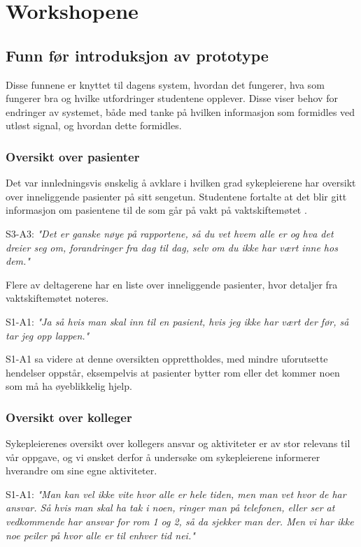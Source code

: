 \section{Workshopene}
\label{ws}

\subsection{Funn før introduksjon av prototype}
Disse funnene er knyttet til dagens system, hvordan det fungerer, hva som fungerer bra og hvilke utfordringer studentene opplever. Disse viser behov for endringer av systemet, både med tanke på hvilken informasjon som formidles ved utløst signal, og hvordan dette formidles.

\subsubsection{Oversikt over pasienter}
Det var innledningsvis ønskelig å avklare i hvilken grad sykepleierene har oversikt over inneliggende pasienter på sitt sengetun. Studentene fortalte at det blir gitt informasjon om pasientene til de som går på vakt på vaktskiftemøtet .

\noindent
S3-A3: \emph{"Det er ganske nøye på rapportene, så du vet hvem alle er og hva det dreier seg om, forandringer fra dag til dag, selv om du ikke har vært inne hos dem."}

\noindent
Flere av deltagerene har en liste over inneliggende pasienter, hvor detaljer fra vaktskiftemøtet noteres.

\noindent
S1-A1: \emph{"Ja så hvis man skal inn til en pasient, hvis jeg ikke har vært der før, så tar jeg opp lappen."}

\noindent
S1-A1 sa videre at denne oversikten opprettholdes, med mindre uforutsette hendelser oppstår, eksempelvis at pasienter bytter rom eller det kommer noen som må ha øyeblikkelig hjelp.
 
 
\subsubsection{Oversikt over kolleger}
Sykepleierenes oversikt over kollegers ansvar og aktiviteter er av stor relevans til vår oppgave, og vi ønsket derfor å undersøke om sykepleierene informerer hverandre om sine egne aktiviteter.

\noindent
S1-A1: \emph{"Man kan vel ikke vite hvor alle er hele tiden, men man vet hvor de har ansvar. Så hvis man skal ha tak i noen, ringer man på telefonen, eller ser at vedkommende har ansvar for rom 1 og 2, så da sjekker man der. Men vi har ikke noe peiler på hvor alle er til enhver tid nei."} 

